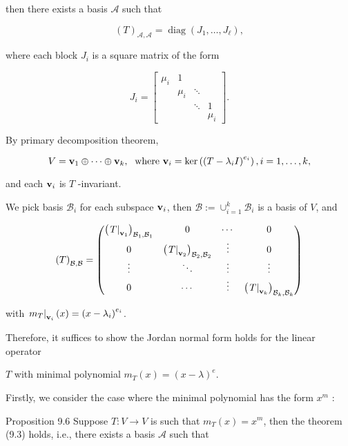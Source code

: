 \documentclass[11pt]{article}
\begin{document}
then there exists a basis \(\mathcal{A}\) such that

\[
{\left( T\right) }_{\mathcal{A},\mathcal{A}} = \operatorname{diag}\left( {{J}_1,\ldots ,{J}_{\ell }}\right) ,
\]

where each block \({J}_{i}\) is a square matrix of the form

\[
{J}_{i} = \left\lbrack  \begin{matrix} {\mu }_{i} & 1 & & \\   & {\mu }_{i} &  \ddots  & \\   & &  \ddots  & 1 \\   & & & {\mu }_{i} \end{matrix}\right\rbrack  .
\]

By primary decomposition theorem,

\[
V = {\bf v}_1 \oplus  \cdots  \oplus  {\bf v}_{k},\;\text{ where }{\bf v}_{i} = \ker \left( {\left( T - {\lambda }_{i}I\right) }^{{e}_{i}}\right) ,i = 1,\ldots ,k,
\]

and each \({\bf v}_{i}\) is \(T\) -invariant.

We pick basis \({\mathcal{B}}_{i}\) for each subspace \({\bf v}_{i}\), then \(\mathcal{B} \mathrel{\text{ := }} { \cup  }_{i = 1}^{k}{\mathcal{B}}_{i}\) is a basis of \(V\), and

\[
{\left( T\right) }_{\mathcal{B},\mathcal{B}} = \left( \begin{matrix} {\left( {\left. T\right| }_{{\bf v}_1}\right) }_{{\mathcal{B}}_1,{\mathcal{B}}_1} & 0 & \cdots & 0 \\  0 & {\left( {\left. T\right| }_{{\bf v}_2}\right) }_{{\mathcal{B}}_2,{\mathcal{B}}_2} & \vdots & 0 \\  \vdots &  \ddots  & \vdots & \vdots \\  0 & \cdots & \vdots & {\left( {\left. T\right| }_{{\bf v}_{k}}\right) }_{{\mathcal{B}}_{k},{\mathcal{B}}_{k}} \end{matrix}\right)
\]

with \({\left. {m}_{T}\right| }_{{\bf v}_{i}}\left( x\right)  = {\left( x - {\lambda }_{i}\right) }^{{e}_{i}}\).

Therefore, it suffices to show the Jordan normal form holds for the linear operator

\(T\) with minimal polynomial \({m}_{T}\left( x\right)  = {\left( x - \lambda \right) }^{e}\).

Firstly, we consider the case where the minimal polynomial has the form \({x}^{m}\) :

Proposition 9.6 Suppose \(T : V \rightarrow  V\) is such that \({m}_{T}\left( x\right)  = {x}^{m}\), then the theorem (9.3) holds, i.e., there exists a basis \(\mathcal{A}\) such that
\end{document}

